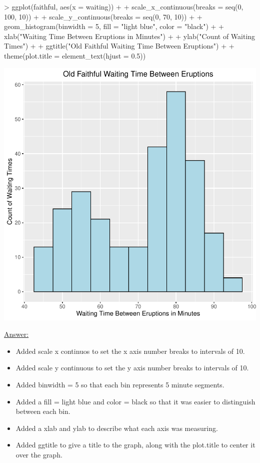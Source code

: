 \documentclass[12pt,letterpaper,final]{article}
\begin{document}
\begin{enumerate}
\begin{enumerate}
\begin{Schunk}
\begin{Sinput}
> ggplot(faithful, aes(x = waiting)) + 
+   scale_x_continuous(breaks = seq(0, 100, 10)) +
+   scale_y_continuous(breaks = seq(0, 70, 10)) +
+   geom_histogram(binwidth = 5, fill = "light blue", color = "black") +
+   xlab("Waiting Time Between Eruptions in Minutes") +
+   ylab("Count of Waiting Times") +
+   ggtitle("Old Faithful Waiting Time Between Eruptions") +
+   theme(plot.title = element_text(hjust = 0.5))
\end{Sinput}
\end{Schunk}
\includegraphics{rnw_example-007}

\underline{Answer:}
\begin{itemize}
\item Added scale x continuos to set the x axis number breaks to intervals of 10.
\item Added scale y continuous to set the y axis number breaks to intervals of 10.
\item Added binwidth = 5 so that each bin represents 5 minute segments.
\item Added a fill = light blue and color = black so that it was easier to distinguish between each bin.
\item Added a xlab and ylab to describe what each axis was measuring.
\item Added ggtitle to give a title to the graph, along with the plot.title to center it over the graph.
\end{itemize}






\end{enumerate}
\end{enumerate}
\end{document}
